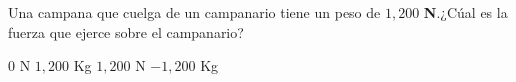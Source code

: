 
\question Una campana que cuelga de un campanario tiene un peso de $1,200$
          \textbf{N}.¿Cúal es la fuerza que ejerce sobre el campanario?

  \begin{oneparchoices}
    \choice $0$ N
    \choice $1,200$ Kg
    \CorrectChoice $1,200$ N
    \choice $-1,200$ Kg
  \end{oneparchoices}
  \answerline[C]
